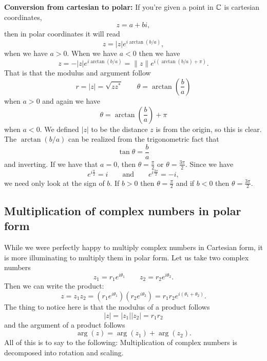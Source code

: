         \noindent \textbf{\textbf{Conversion from cartesian to polar:}} If you're given a point in $\mathbb{C}$ is cartesian coordinates,
        \[
        z=a+bi,
        \]
        then in polar coordinates it will read
        \[
        z=|z|e^{i\arctan(b/a)},
        \]
        when we have $a>0$. When we have $a<0$ then we have
        \[
        z=-|z|e^{i\arctan(b/a)}=\|z\|e^{i(\arctan(b/a)+\pi)}.
        \]
        That is that the modulus and argument follow
        \[
        r = |z|=\sqrt{zz^*} \qquad \theta = \arctan\left( \frac{b}{a}\right)
        \]
        when $a>0$ and again we have
        \[
        \theta = \arctan\left(\frac{b}{a}\right)+\pi
        \]
        when $a<0$. We defined $|z|$ to be the distance $z$ is from the origin, so this is clear.  The $\arctan(b/a)$ can be realized from the trigonometric fact that
        \[
        \tan \theta = \frac{b}{a}
        \]
        and inverting. If we have that $a=0$, then $\theta=\frac{\pi}{2}$ or $\theta=\frac{3\pi}{2}$. Since we have
        \[
        e^{i\frac{\pi}{2}}=i \qquad \textrm{and} \qquad e^{i\frac{3\pi}{2}}=-i,
        \]
        we need only look at the sign of $b$.  If $b>0$ then $\theta=\frac{\pi}{2}$ and if $b<0$ then $\theta=\frac{3\pi}{2}$.
        
        
        \subsection{Multiplication of complex numbers in polar form}
        
        While we were perfectly happy to multiply complex numbers in Cartesian form, it is more illuminating to multiply them in polar form.  Let us take two complex numbers
        \[
        z_1 = r_1 e^{i\theta_1} \qquad z_2 = r_2 e^{i\theta_2}.
        \]
        Then we can write the product:
        \[
        z=z_1 z_2 = (r_1 e^{i\theta_1})(r_2 e^{i\theta_2})= r_1r_2 e^{i(\theta_1+\theta_2)}.
        \]
        The thing to notice here is that the modulus of a product follows
        \[
        |z|=|z_1||z_2|=r_1r_2
        \]
        and the argument of a product follows
        \[
        \arg(z)=\arg(z_1)+\arg(z_2).
        \]
        All of this is to say to the following: Multiplication of complex numbers is decomposed into rotation and scaling. 
        
